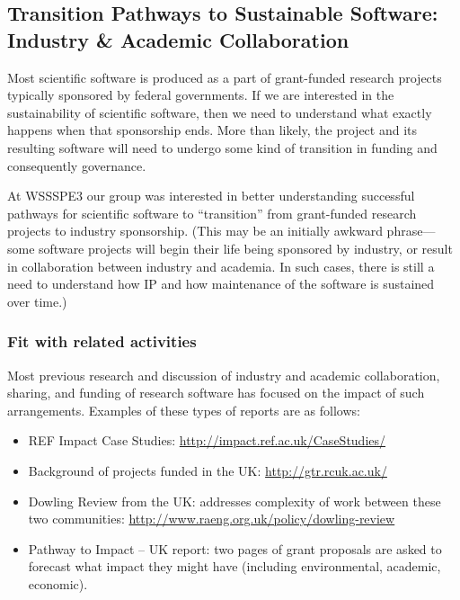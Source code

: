 
\subsection{Transition Pathways to Sustainable Software: Industry \& Academic Collaboration}
\label{sec:industry_interaction}


Most scientific software is produced as a part of grant-funded research projects
typically sponsored by federal governments. If we are interested in the
sustainability of scientific software, then we need to understand what exactly
happens when that sponsorship ends. More than likely, the project and its
resulting software will need to undergo some kind of transition in funding and
consequently governance.

At WSSSPE3 our group was interested in better understanding successful pathways
for scientific software to ``transition'' from grant-funded research projects to
industry sponsorship. (This may be an initially awkward phrase---some software
projects will begin their life being sponsored by industry, or result in
collaboration between industry and academia. In such cases, there is still a
need to understand how IP and how maintenance of the software is sustained over
time.)

\subsubsection{Fit with related activities}

Most previous research and discussion of industry and academic collaboration,
sharing, and funding of research software has focused on the impact of such
arrangements. Examples of these types of reports are as follows:

\begin{itemize}
\item REF Impact Case Studies: \url{http://impact.ref.ac.uk/CaseStudies/}
\item Background of projects funded in the UK: \url{http://gtr.rcuk.ac.uk/}
\item Dowling Review from the UK: addresses complexity of work between these two
communities: \url{http://www.raeng.org.uk/policy/dowling-review}
\item Pathway to Impact -- UK report: two pages of grant proposals are asked to
forecast what impact they might have (including environmental, academic, economic).
\end{itemize}


